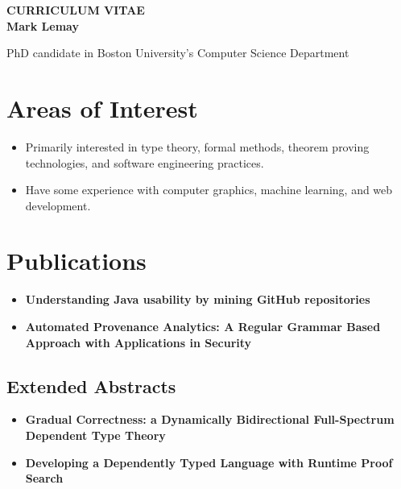 

\begin{center}
{\LARGE {\bf CURRICULUM VITAE}}\\
\vspace{0.5in}
{\large {\bf Mark Lemay}}
\end{center}
PhD candidate in Boston University's Computer Science Department


\section*{Areas of Interest}
\begin{itemize}
  \item Primarily interested in type theory, formal methods, theorem proving technologies, and software engineering practices.
  \item Have some experience with computer graphics, machine learning, and web development.
\end{itemize}

\section*{Publications}
\begin{itemize}
  \item \textbf{Understanding Java usability by mining GitHub repositories}\cite{lemay2019understanding}
  \item \textbf{Automated Provenance Analytics: A Regular Grammar Based Approach with Applications in Security}\cite{lemay2017automated}
\end{itemize}

\subsection*{Extended Abstracts}
\begin{itemize}
  \item \textbf{Gradual Correctness: a Dynamically Bidirectional Full-Spectrum Dependent Type Theory}\cite{gradualcorrectnessea}
  \item \textbf{Developing a Dependently Typed Language with Runtime Proof Search}\cite{extendedabstract}
\end{itemize}


